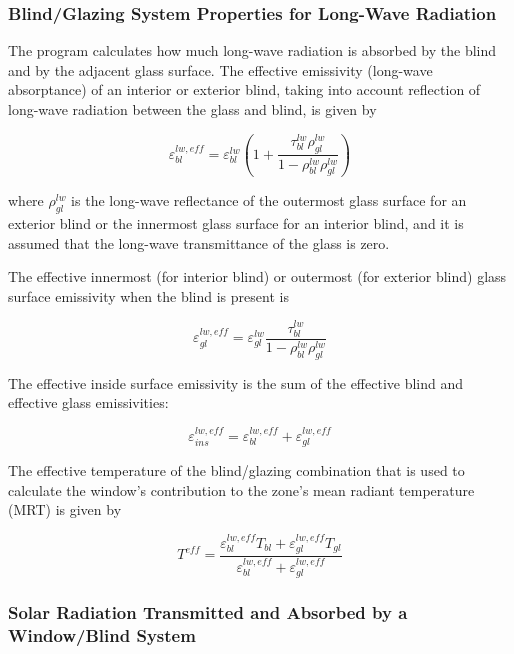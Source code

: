 \subsubsection{Blind/Glazing System Properties for Long-Wave Radiation}\label{blindglazing-system-properties-for-long-wave-radiation}

The program calculates how much long-wave radiation is absorbed by the blind and by the adjacent glass surface. The effective emissivity (long-wave absorptance) of an interior or exterior blind, taking into account reflection of long-wave radiation between the glass and blind, is given by

\begin{equation}
\varepsilon_{bl}^{lw,eff} = \varepsilon_{bl}^{lw}\left( {1 + \frac{{\tau_{bl}^{lw}\rho_{gl}^{lw}}}{{1 - \rho_{bl}^{lw}\rho_{gl}^{lw}}}} \right)
\end{equation}

where \(\rho_{gl}^{lw}\) is the long-wave reflectance of the outermost glass surface for an exterior blind or the innermost glass surface for an interior blind, and it is assumed that the long-wave transmittance of the glass is zero.

The effective innermost (for interior blind) or outermost (for exterior blind) glass surface emissivity when the blind is present is

\begin{equation}
\varepsilon_{gl}^{lw,eff} = \varepsilon_{gl}^{lw}\frac{{\tau_{bl}^{lw}}}{{1 - \rho_{bl}^{lw}\rho_{gl}^{lw}}}
\end{equation}

The effective inside surface emissivity is the sum of the effective blind and effective glass emissivities:

\begin{equation}
\varepsilon_{ins}^{lw,eff} = \varepsilon_{bl}^{lw,eff} + \varepsilon_{gl}^{lw,eff}
\end{equation}

The effective temperature of the blind/glazing combination that is used to calculate the window's contribution to the zone's mean radiant temperature (MRT) is given by

\begin{equation}
T_{}^{eff} = \frac{{\varepsilon_{bl}^{lw,eff}{T_{bl}} + \varepsilon_{gl}^{lw,eff}{T_{gl}}}}{{\varepsilon_{bl}^{lw,eff} + \varepsilon_{gl}^{lw,eff}}}
\end{equation}

\subsubsection{Solar Radiation Transmitted and Absorbed by a Window/Blind System}\label{solar-radiation-transmitted-and-absorbed-by-a-windowblind-system}

